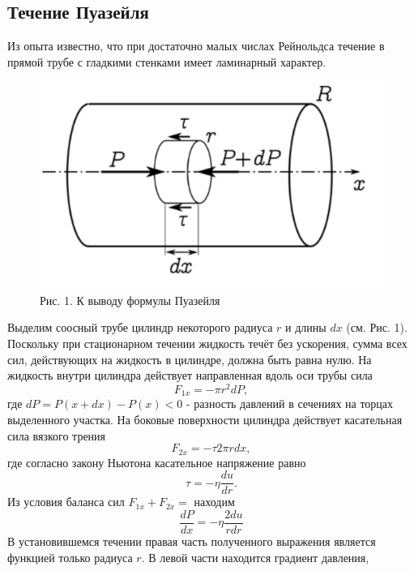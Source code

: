 \documentclass[a4paper]{article}
\begin{document}
\subsection{Течение Пуазейля}
Из опыта известно, что при достаточно малых числах
Рейнольдса течение в прямой трубе с гладкими стенками имеет ламинарный
характер. 
\begin{figure}[h!]
        \centering
        \includegraphics[scale=0.5]{Pictures/Puaseil.png}
        \caption{
        Рис. 1. К выводу формулы Пуазейля
        }
 \end{figure}
Выделим соосный трубе цилиндр некоторого радиуса $r$ и длины $dx$ (см.
Рис. 1). Поскольку при стационарном течении жидкость течёт без ускорения,
сумма всех сил, действующих на жидкость в цилиндре, должна быть равна
нулю. На жидкость внутри цилиндра действует направленная вдоль оси трубы
сила
\begin{equation*}
	F_{1x} = -\pi r^2dP,
\end{equation*}
где $dP = P(x + dx) - P(x) < 0$ - разность давлений в сечениях на торцах
выделенного участка. На боковые поверхности цилиндра действует касательная сила вязкого трения
\begin{equation*}
	F_{2x} = -\tau 2\pi rdx,
\end{equation*}
где согласно закону Ньютона касательное напряжение равно
\begin{equation*}
	\tau = -\eta \frac{du}{dr}.
\end{equation*}
Из условия баланса сил $F_{1x} + F_{2x} = $ находим
\begin{equation*}
	\frac{dP}{dx} = -\eta \frac{2du}{rdr}
\end{equation*}
В установившемся течении правая часть полученного выражения является
функцией только радиуса $r$. В левой части находится градиент давления,
\end{document}

